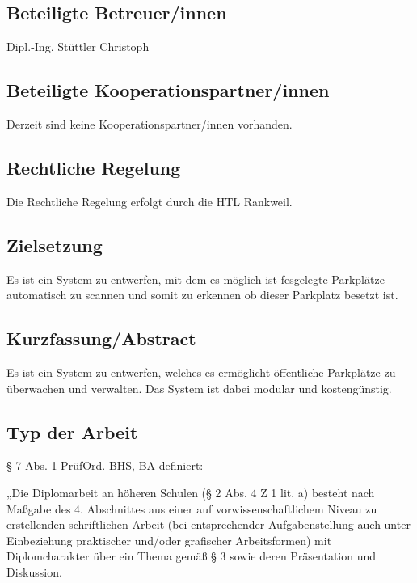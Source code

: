 \subsection{Beteiligte Betreuer/innen}
Dipl.-Ing. Stüttler Christoph

\subsection{Beteiligte Kooperationspartner/innen}
Derzeit sind keine Kooperationspartner/innen vorhanden.

\subsection{Rechtliche Regelung}
Die Rechtliche Regelung erfolgt durch die HTL Rankweil.

\subsection{Zielsetzung}
Es ist ein System zu entwerfen, mit dem es möglich ist fesgelegte Parkplätze automatisch zu scannen und somit zu erkennen ob dieser Parkplatz besetzt ist.

\subsection{Kurzfassung/Abstract}
Es ist ein System zu entwerfen, welches es ermöglicht öffentliche Parkplätze zu überwachen und verwalten. Das System ist dabei modular und kostengünstig.

\subsection{Typ der Arbeit}
§ 7 Abs. 1 PrüfOrd. BHS, BA definiert:

„Die Diplomarbeit an höheren Schulen (§ 2 Abs. 4 Z 1 lit. a)
besteht nach Maßgabe des 4. Abschnittes aus einer auf vorwissenschaftlichem Niveau zu erstellenden
schriftlichen Arbeit (bei entsprechender Aufgabenstellung auch unter Einbeziehung praktischer und/oder
grafischer Arbeitsformen) mit Diplomcharakter über ein Thema gemäß § 3 sowie deren Präsentation und
Diskussion.